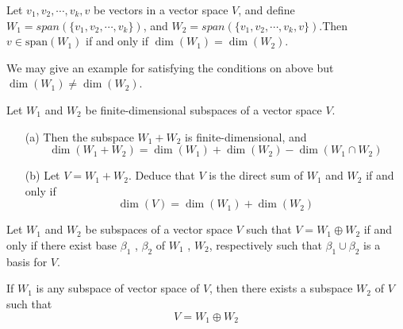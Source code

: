 \begin{thm}
Let $v_1, v_2, \cdots , v_k, v$ be vectors in a vector space $V$, and define $W_1 = span(\{v_1, v_2, \cdots , v_k\})$, and $W_2 = span(\{v_1, v_2, \cdots , v_k , v \})$.Then $v \in \mathrm{span}(W_1)$ if and only if $\dim(W_1) = \dim(W_2)$.
\end{thm}

\begin{rmk*}
	We may give an example for satisfying the conditions on above but $\dim(W_1) \neq \dim(W_2)$.
\end{rmk*}


\begin{thm}Let $W_1$ and $W_2$ be finite-dimensional subspaces of a vector space $V$.
\begin{enumerate} 
	\item [(a)]Then the subspace $W_1 + W_2$ is finite-dimensional, and $$\dim(W_1 + W_2) = \dim(W_1) + \dim(W_2) - \dim(W_1 \cap W_2)$$
    \item [(b)]  Let $V = W_1 + W_2$. Deduce that $V$ is the direct sum of $W_1$ and $W_2$ if and only if $$\dim(V) = \dim(W_1) + \dim(W_2)$$
\end{enumerate}	
\end{thm}

\begin{thm}Let $W_1$ and $W_2$ be subspaces of a vector space $V$ such that $V = W_1 \oplus W_2$ if and only if there exist base $\beta_1$ , $\beta_2$ of $W_1$ , $W_2$, respectively such that $\beta_1 \cup \beta_2$ is a basis for $V$.
\end{thm}

\begin{thm}
		\item If $W_1$ is any subspace of vector space of $V$, then there exists a subspace $W_2$ of $V$ such that $$ V = W_1 \oplus W_2 $$
\end{thm}





